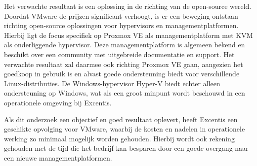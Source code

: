 Het verwachte resultaat is een oplossing in de richting van de open-source wereld. Doordat VMware de prijzen significant verhoogt, is er een beweging ontstaan richting open-source oplossingen voor hypervisors en managementplatformen.
Hierbij ligt de focus specifiek op Proxmox VE als managementplatform met KVM als onderliggende hypervisor. Deze managementplatform is algemeen bekend en beschikt over een community met uitgebreide documentatie en support.
Het verwachte resultaat zal daarmee ook richting Proxmox VE gaan, aangezien het goedkoop in gebruik is en alvast goede ondersteuning biedt voor verschillende Linux-distributies.
De Windows-hypervisor Hyper-V biedt echter alleen ondersteuning op Windows, wat als een groot minpunt wordt beschouwd in een operationele omgeving bij Excentis.

Als dit onderzoek een objectief en goed resultaat oplevert, heeft Excentis een geschikte opvolging voor VMware, waarbij de kosten en nadelen in operationele werking zo minimaal mogelijk worden gehouden.
Hierbij wordt ook rekening gehouden met de tijd die het bedrijf kan besparen door een goede overgang naar een nieuwe managementplatformen.




